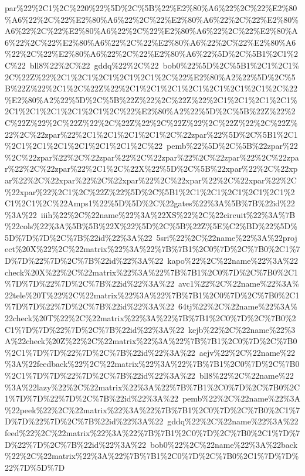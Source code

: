 \documentclass[onecolumn,unpublished,a4paper]{quantumarticle}
\theoremstyle{definition}
\begin{document}
par\%22\%2C1\%2C\%220\%22\%5D\%2C\%5B\%22\%E2\%80\%A6\%22\%2C\%22\%E2\%80\%A6\%22\%2C\%22\%E2\%80\%A6\%22\%2C\%22\%E2\%80\%A6\%22\%2C\%22\%E2\%80\%A6\%22\%2C\%22\%E2\%80\%A6\%22\%2C\%22\%E2\%80\%A6\%22\%2C\%22\%E2\%80\%A6\%22\%2C\%22\%E2\%80\%A6\%22\%2C\%22\%E2\%80\%A6\%22\%2C\%22\%E2\%80\%A6\%22\%2C\%22\%E2\%80\%A6\%22\%2C\%22\%E2\%80\%A6\%22\%5D\%2C\%5B1\%2C1\%2C\%22~bll8\%22\%2C\%22~gddq\%22\%2C\%22~bob0\%22\%5D\%2C\%5B1\%2C1\%2C1\%2C\%22Z\%22\%2C1\%2C1\%2C1\%2C1\%2C1\%2C\%22\%E2\%80\%A2\%22\%5D\%2C\%5B\%22Z\%22\%2C1\%2C\%22Z\%22\%2C1\%2C1\%2C1\%2C1\%2C1\%2C1\%2C1\%2C\%22\%E2\%80\%A2\%22\%5D\%2C\%5B\%22Z\%22\%2C\%22Z\%22\%2C1\%2C1\%2C1\%2C1\%2C1\%2C1\%2C1\%2C1\%2C1\%2C\%22\%E2\%80\%A2\%22\%5D\%2C\%5B\%22Z\%22\%2C\%22Z\%22\%2C\%22Z\%22\%2C\%22Z\%22\%2C\%22Z\%22\%2C\%22Z\%22\%2C\%22Z\%22\%2C\%22zpar\%22\%2C1\%2C1\%2C1\%2C1\%2C\%22zpar\%22\%5D\%2C\%5B1\%2C1\%2C1\%2C1\%2C1\%2C1\%2C1\%2C1\%2C\%22~pemb\%22\%5D\%2C\%5B\%22zpar\%22\%2C\%22zpar\%22\%2C\%22zpar\%22\%2C\%22zpar\%22\%2C\%22zpar\%22\%2C\%22zpar\%22\%2C\%22zpar\%22\%2C1\%2C\%22X\%22\%5D\%2C\%5B\%22xpar\%22\%2C\%22xpar\%22\%2C\%22xpar\%22\%2C\%22xpar\%22\%2C\%22xpar\%22\%2C\%22xpar\%22\%2C\%22xpar\%22\%2C1\%2C\%22Z\%22\%5D\%2C\%5B1\%2C1\%2C1\%2C1\%2C1\%2C1\%2C1\%2C1\%2C\%22Amps1\%22\%5D\%5D\%2C\%22gates\%22\%3A\%5B\%7B\%22id\%22\%3A\%22~iiih\%22\%2C\%22name\%22\%3A\%22XS\%22\%2C\%22circuit\%22\%3A\%7B\%22cols\%22\%3A\%5B\%5B\%22X\%22\%5D\%2C\%5B\%22Z\%5E\%C2\%BD\%22\%5D\%5D\%7D\%7D\%2C\%7B\%22id\%22\%3A\%22~5sri\%22\%2C\%22name\%22\%3A\%22project\%20X\%22\%2C\%22matrix\%22\%3A\%22\%7B\%7B1\%2C0\%7D\%2C\%7B0\%2C1\%7D\%7D\%22\%7D\%2C\%7B\%22id\%22\%3A\%22~kapo\%22\%2C\%22name\%22\%3A\%22check\%20X\%22\%2C\%22matrix\%22\%3A\%22\%7B\%7B1\%2C0\%7D\%2C\%7B0\%2C1\%7D\%7D\%22\%7D\%2C\%7B\%22id\%22\%3A\%22~avc1\%22\%2C\%22name\%22\%3A\%22tele\%20T\%22\%2C\%22matrix\%22\%3A\%22\%7B\%7B1\%2C0\%7D\%2C\%7B0\%2C1\%7D\%7D\%22\%7D\%2C\%7B\%22id\%22\%3A\%22~64tj\%22\%2C\%22name\%22\%3A\%22check\%20T\%22\%2C\%22matrix\%22\%3A\%22\%7B\%7B1\%2C0\%7D\%2C\%7B0\%2C1\%7D\%7D\%22\%7D\%2C\%7B\%22id\%22\%3A\%22~kejb\%22\%2C\%22name\%22\%3A\%22check\%20Z\%22\%2C\%22matrix\%22\%3A\%22\%7B\%7B1\%2C0\%7D\%2C\%7B0\%2C1\%7D\%7D\%22\%7D\%2C\%7B\%22id\%22\%3A\%22~aejv\%22\%2C\%22name\%22\%3A\%22feedback\%22\%2C\%22matrix\%22\%3A\%22\%7B\%7B1\%2C0\%7D\%2C\%7B0\%2C1\%7D\%7D\%22\%7D\%2C\%7B\%22id\%22\%3A\%22~bll8\%22\%2C\%22name\%22\%3A\%22lazy\%22\%2C\%22matrix\%22\%3A\%22\%7B\%7B1\%2C0\%7D\%2C\%7B0\%2C1\%7D\%7D\%22\%7D\%2C\%7B\%22id\%22\%3A\%22~pemb\%22\%2C\%22name\%22\%3A\%22peek\%22\%2C\%22matrix\%22\%3A\%22\%7B\%7B1\%2C0\%7D\%2C\%7B0\%2C1\%7D\%7D\%22\%7D\%2C\%7B\%22id\%22\%3A\%22~gddq\%22\%2C\%22name\%22\%3A\%22feed\%22\%2C\%22matrix\%22\%3A\%22\%7B\%7B1\%2C0\%7D\%2C\%7B0\%2C1\%7D\%7D\%22\%7D\%2C\%7B\%22id\%22\%3A\%22~bob0\%22\%2C\%22name\%22\%3A\%22back\%22\%2C\%22matrix\%22\%3A\%22\%7B\%7B1\%2C0\%7D\%2C\%7B0\%2C1\%7D\%7D\%22\%7D\%5D\%7D
\end{document}
